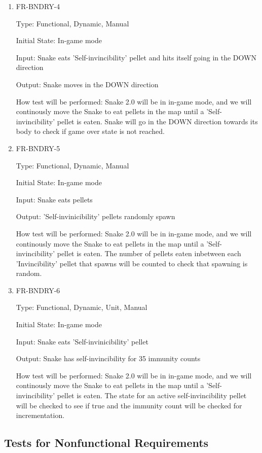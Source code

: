 \documentclass[12pt, titlepage]{article}
\begin{document}
\begin{enumerate}
\item{FR-BNDRY-4}
\label{fr:bndry-4}

Type: Functional, Dynamic, Manual

Initial State: In-game mode

Input: Snake eats 'Self-invincibility' pellet and hits itself going in the DOWN direction

Output: Snake moves in the DOWN direction

How test will be performed: Snake 2.0 will be in in-game mode, and we will continously move the Snake to eat pellets in the map until a 'Self-invincibility' pellet is eaten. Snake will go in the DOWN direction towards its body to check if game over state is not reached.

\item{FR-BNDRY-5}
\label{fr:bndry-5}

Type: Functional, Dynamic, Manual

Initial State: In-game mode

Input: Snake eats pellets

Output: 'Self-invinicibility' pellets randomly spawn

How test will be performed: Snake 2.0 will be in in-game mode, and we will continously move the Snake to eat pellets in the map until a 'Self-invincibility' pellet is eaten. The number of pellets eaten inbetween each 'Invincibility' pellet that spawns will be counted to check that spawning is random.

\item{FR-BNDRY-6}
\label{fr:bndry-6}

Type: Functional, Dynamic, Unit, Manual

Initial State: In-game mode

Input: Snake eats 'Self-invinicibility' pellet

Output: Snake has self-invincibility for 35 immunity counts

How test will be performed: Snake 2.0 will be in in-game mode, and we will continously move the Snake to eat pellets in the map until a 'Self-invincibility'  pellet is eaten. The state for an active self-invincibility pellet will be checked to see if true and the immunity count will be checked for incrementation. 

\end{enumerate}


\subsection{Tests for Nonfunctional Requirements}
\end{document}
